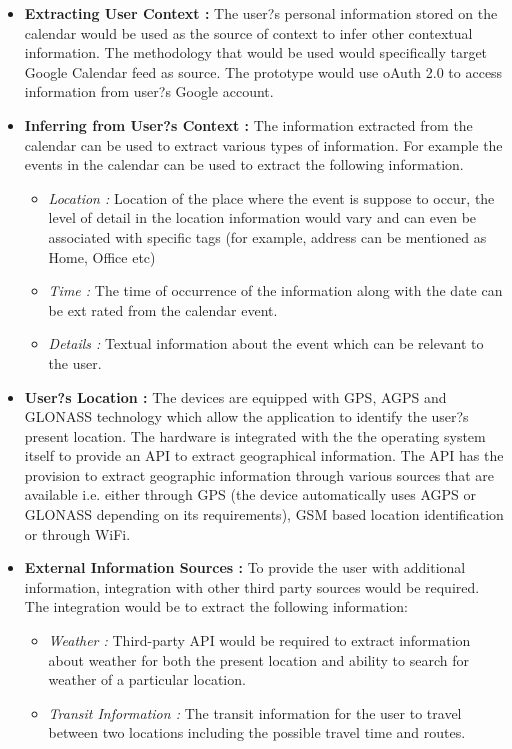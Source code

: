 \documentclass[12pt]{report}
\begin{document}
\begin{itemize}
\item \textbf{Extracting User Context :} The user?s personal information stored on the calendar would be used as the source of context to infer other contextual information. The methodology that would be used would specifically target Google Calendar feed as source. The prototype would use oAuth 2.0 to access information from user?s Google account.

\item \textbf{Inferring from User?s Context :} The information extracted from the calendar can be used to extract various types of information. For example the events in the calendar can be used to extract the following information.

\begin{itemize}
\item \textit{Location :} Location of the place where the event is suppose to occur, the level of detail in the location information would vary and can even be associated with specific tags (for example, address can be mentioned as Home, Office etc)
\item \textit{Time :} The time of occurrence of the information along with the date can be ext rated from the calendar event.
\item \textit{Details :} Textual information about the event which can be relevant to the user.
\end{itemize}

\item \textbf{User?s Location :} The devices are equipped with GPS, AGPS and GLONASS technology which allow the application to identify the user?s present location. The hardware is integrated with the the operating system itself to provide an API to extract geographical information. The API has the provision to extract geographic information through various sources that are available i.e. either through GPS (the device automatically uses AGPS or GLONASS depending on its requirements), GSM based location identification or through WiFi.

\item \textbf{External Information Sources :} To provide the user with additional information, integration with other third party sources would be required. The integration would be to extract the following information:
\begin{itemize}
\item \textit{Weather :} Third-party API would be required to extract information about weather for both the present location and ability to search for weather of a particular location.
\item \textit{Transit Information :} The transit information for the user to travel between two locations including the possible travel time and routes.
\end{itemize}
\end{itemize}
\end{document}
